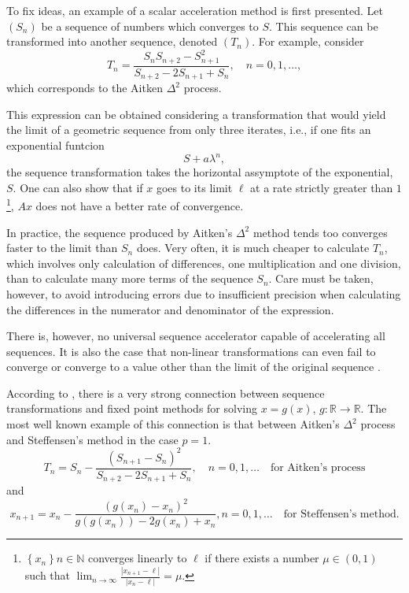 To fix ideas, an example of a scalar acceleration method is first presented.
Let \((S_n)\) be a sequence of numbers which converges to \(S\).
This sequence can be transformed into another sequence, denoted \((T_n)\).
For example, consider
\begin{equation}
  T_n = \frac{S_n S_{n+2} - S^2_{n+1}}{S_{n+2}-2S_{n+1} + S_n},\quad n=0,1,\dots,
\end{equation}
which corresponds to the Aitken \(\Delta^2\) process.

This expression can be obtained considering a transformation that would yield the limit of a geometric sequence from only three iterates, i.e., if one fits an exponential funtcion
\begin{equation}
  S + a \lambda^n,
\end{equation}
the sequence transformation takes the horizontal assymptote of the exponential, \(S\).
One can also show that if \(x\) goes to its limit \(\ell\) at a rate strictly greater than \(1\)\footnote{$\left\{x_{n}\right\}{n \in \mathbb{N}}$ converges linearly to $\ell$ if there exists a number $\mu \in(0,1)$ such that \(\lim_{n \rightarrow \infty} \frac{\left|x_{n+1}-\ell\right|}{\left|x_{n}-\ell\right|}=\mu\).}, \(A x\) does not have a better rate of convergence.

In practice, the sequence produced by Aitken's \(\Delta^2\) method tends too converges faster to the limit than \(S_n\) does.
Very often, it is much cheaper to calculate \(T_n\), which involves only calculation of differences, one multiplication and one division, than to calculate many more terms of the sequence \(S_n\). 
Care must be taken, however, to avoid introducing errors due to insufficient precision when calculating the differences in the numerator and denominator of the expression.

There is, however, no universal sequence accelerator capable of accelerating all sequences.
It is also the case that non-linear transformations can even fail to converge or converge to a value other than the limit of the original sequence \citep{brezinski_extrapolation_2013}.

According to \cite{brezinski_extrapolation_2013}, there is a very strong connection between sequence transformations and fixed point methods for solving \(x= g( x)\), \(g\colon \mathbb R\to \mathbb R\).
The most well known example of this connection is that between Aitken's \(\Delta^{2}\) process and Steffensen's method in the case \(p=1\).
\begin{equation}
T_{n}=S_{n}-\frac{\left(S_{n+1}-S_{n}\right)^{2}}{S_{n+2}-2 S_{n+1}+S_{n}}, \quad n=0,1, \ldots \quad\text{for Aitken's process}
\end{equation}
and
\begin{equation}
x_{n+1}=x_{n}-\frac{\left(g\left(x_{n}\right)-x_{n}\right)^{2}}{g\left(g\left(x_{n}\right)\right)-2 g\left(x_{n}\right)+x_{n}}, n=0,1, \ldots \quad\text{for Steffensen's method.}
\end{equation}

